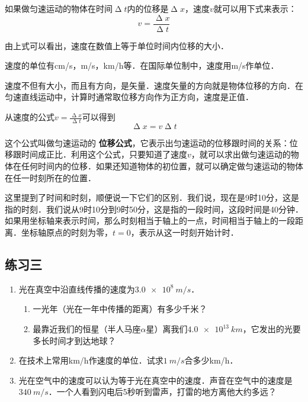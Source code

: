 如果做匀速运动的物体在时间$\upDelta t$内的位移是$\upDelta x$，速度$v$就可以用下式来表示：
\begin{equation}
    v=\frac{\upDelta x}{\upDelta t}
\end{equation}

由上式可以看出，速度在数值上等于单位时间内位移的大小．

速度的单位有\si{cm/s}，\si{m/s}，\si{km/h}等．在国际单位制中，速度用\si{m/s}作单位．

速度不但有大小，而且有方向，是矢量．速度矢量的方向就是物体位移的方向．在匀速直线运动中，计算时通常取位移方向作为正方向，速度是正值．

从速度的公式$v=\frac{\upDelta x}{\upDelta t}$可以得到
\begin{equation}
    \upDelta x=v\upDelta t
\end{equation}

这个公式叫做匀速运动的\textbf{ 位移公式}，它表示出匀速运动的位移跟时间的关系：位移跟时间成正比．利用这个公式，只要知道了速度$v$，就可以求出做匀速运动的物体在任何时间内的位移．如果还知道物体的初位置，就可以确定做匀速运动的物体在任一时刻所在的位置．

这里提到了时间和时刻，顺便说一下它们的区别．我们说，现在是9时10分，这是指的时刻．我们说从9时10分到9时50分，这是指的一段时间，这段时间是40分钟．如果用坐标轴来表示时间，那么时刻相当于轴上的一点，时间相当于轴上的一段距离．坐标轴原点的时刻为零，$t=0$，表示从这一时刻开始计时．

\subsection*{练习三}

\begin{enumerate}
    \item 光在真空中沿直线传播的速度为$\qty{3.0e8}{m/s}$．
          \begin{enumerate}
              \item 一光年（光在一年中传播的距离）有多少千米？
              \item 最靠近我们的恒星（半人马座$\alpha$星）离我们$\qty{4.0e13}{km}$，它发出的光要多长时间才到达地球？
          \end{enumerate}
    \item  在技术上常用\si{km/h}作速度的单位．试求$\qty{1}{m/s}$合多少\si{km/h}．
    \item 光在空气中的速度可以认为等于光在真空中的速度．声音在空气中的速度是$\qty{340}{m/s}$．一个人看到闪电后5秒听到雷声，打雷的地方离他大约多远？

\end{enumerate}

